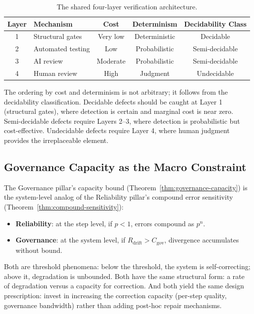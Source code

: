 \documentclass[11pt, a4paper, logo, copyright]{googledeepmind}
\begin{document}
\begin{table}[h]
\centering
\caption{The shared four-layer verification architecture.}
\label{tab:four-layer}
\begin{tabular}{clccc}
\toprule
\textbf{Layer} & \textbf{Mechanism} & \textbf{Cost} & \textbf{Determinism} & \textbf{Decidability Class} \\
\midrule
1 & Structural gates & Very low & Deterministic & Decidable \\
2 & Automated testing & Low & Probabilistic & Semi-decidable \\
3 & AI review & Moderate & Probabilistic & Semi-decidable \\
4 & Human review & High & Judgment & Undecidable \\
\bottomrule
\end{tabular}
\end{table}

The ordering by cost and determinism is not arbitrary; it follows from the decidability classification. Decidable defects should be caught at Layer 1 (structural gates), where detection is certain and marginal cost is near zero. Semi-decidable defects require Layers 2--3, where detection is probabilistic but cost-effective. Undecidable defects require Layer 4, where human judgment provides the irreplaceable element.

\subsection{Governance Capacity as the Macro Constraint}

The Governance pillar's capacity bound (Theorem~\ref{thm:governance-capacity}) is the system-level analog of the Reliability pillar's compound error sensitivity (Theorem~\ref{thm:compound-sensitivity}):

\begin{itemize}[nosep]
    \item \textbf{Reliability}: at the step level, if $p < 1$, errors compound as $p^n$.
    \item \textbf{Governance}: at the system level, if $R_{\text{drift}} > C_{\text{gov}}$, divergence accumulates without bound.
\end{itemize}

Both are threshold phenomena: below the threshold, the system is self-correcting; above it, degradation is unbounded. Both have the same structural form: a rate of degradation versus a capacity for correction. And both yield the same design prescription: invest in increasing the correction capacity (per-step quality, governance bandwidth) rather than adding post-hoc repair mechanisms.
\end{document}
